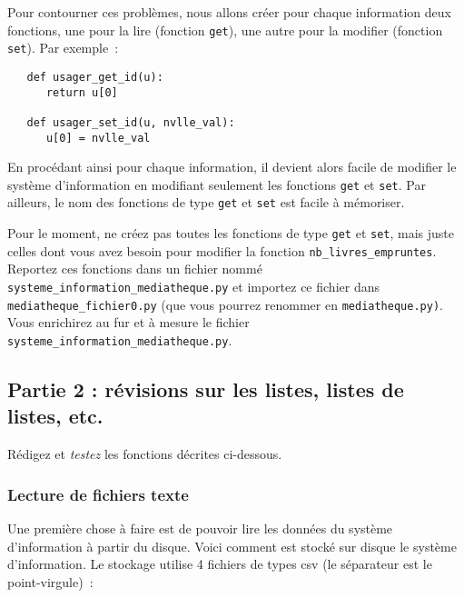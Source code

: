 \documentclass[10pt,a4paper]{sujets-exercices}
\begin{document}
Pour contourner ces problèmes, nous allons créer pour chaque information deux fonctions, une pour la lire (fonction \texttt{get}), une autre pour la modifier (fonction \texttt{set}). Par exemple~:

\begin{verbatim}
   def usager_get_id(u):
      return u[0]

   def usager_set_id(u, nvlle_val):
      u[0] = nvlle_val
\end{verbatim}

En procédant ainsi pour chaque information, il devient alors facile de modifier le système d'information en modifiant seulement les fonctions \texttt{get} et \texttt{set}. Par ailleurs, le nom des fonctions de type \texttt{get} et \texttt{set} est facile à mémoriser.

Pour le moment, ne créez pas toutes les fonctions de type \texttt{get} et \texttt{set}, mais juste celles dont vous avez besoin pour modifier la fonction \texttt{nb\_livres\_empruntes}. Reportez ces fonctions dans un fichier nommé \texttt{systeme\_information\_mediatheque.py} et importez ce fichier dans \texttt{mediatheque\_fichier0.py} (que vous pourrez renommer en \texttt{mediatheque.py)}. Vous enrichirez au fur et à mesure le fichier \texttt{systeme\_information\_mediatheque.py}.

\subsection{Partie 2 : révisions sur les listes, listes de listes, etc.}

Rédigez et \emph{testez} les fonctions décrites ci-dessous.


\subsubsection{Lecture de fichiers texte}

Une première chose à faire est de pouvoir lire les données du système d'information à partir du disque. Voici comment est stocké sur disque le système d'information. Le stockage utilise 4 fichiers de types csv (le séparateur est le point-virgule)~:
\end{document}
